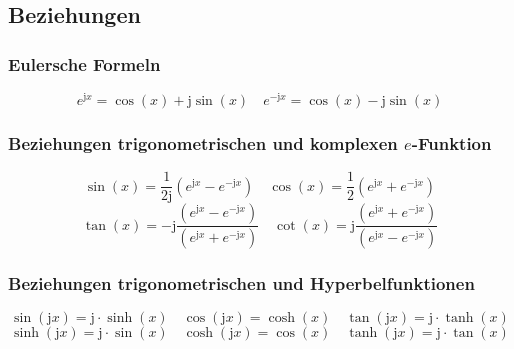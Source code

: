 \subsection{Beziehungen}
\subsubsection{Eulersche Formeln}
\begin{equation}
\boxed{e^{\text{j}x}=\cos\left(x\right)+\text{j}\sin\left(x\right)}
\quad
\boxed{e^{-\text{j}x}=\cos\left(x\right)-\text{j}\sin\left(x\right)}
\end{equation}
\subsubsection{Beziehungen trigonometrischen und komplexen $e$-Funktion}
\begin{equation}
\boxed{\sin\left(x\right)=\dfrac{1}{2\text{j}}\left(e^{\text{j}x}-e^{-\text{j}x}\right)}
\quad
\boxed{\cos\left(x\right)=\dfrac{1}{2}\left(e^{\text{j}x}+e^{-\text{j}x}\right)}
\end{equation}
\begin{equation}
\boxed{\tan\left(x\right)=-\text{j}\dfrac{\left(e^{\text{j}x}-e^{-\text{j}x}\right)}{\left(e^{\text{j}x}+e^{-\text{j}x}\right)}}
\quad
\boxed{\cot\left(x\right)=\text{j}\dfrac{\left(e^{\text{j}x}+e^{-\text{j}x}\right)}{\left(e^{\text{j}x}-e^{-\text{j}x}\right)}}
\end{equation}
\subsubsection{Beziehungen trigonometrischen und Hyperbelfunktionen}
\begin{equation}
\boxed{\sin\left(\text{j}x\right)=\text{j}\cdot \sinh\left(x\right)}\quad \boxed{\cos\left(\text{j}x\right)=\cosh\left(x\right)}\quad \boxed{\tan\left(\text{j}x\right)=\text{j}\cdot \tanh\left (x\right)}
\end{equation}
\begin{equation}
\boxed{\sinh\left(\text{j}x\right)=\text{j}\cdot \sin\left(x\right)}\quad \boxed{\cosh\left(\text{j}x\right)=\cos\left(x\right)}\quad \boxed{\tanh\left(\text{j}x\right)=\text{j}\cdot \tan\left (x\right)}
\end{equation}
